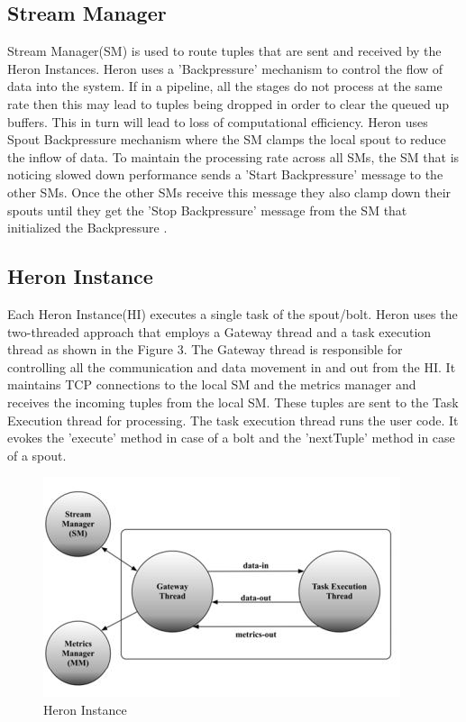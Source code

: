\documentclass[9pt,twocolumn,twoside]{styles/osajnl}
\begin{document}
\subsection{Stream Manager}
Stream Manager(SM) is used to route tuples that are sent and received by the Heron Instances. Heron uses a 'Backpressure' mechanism to control the flow of data into the system. If in a pipeline, all the stages do not process at the same rate then this may lead to tuples being dropped in order to clear the queued up buffers. This in turn will lead to loss of computational efficiency. Heron uses Spout Backpressure mechanism where the SM clamps the local spout to reduce the inflow of data. To maintain the processing rate across all SMs, the SM that is noticing slowed down performance sends a 'Start Backpressure' message to the other SMs. Once the other SMs receive this message they also clamp down their spouts until they get the 'Stop Backpressure' message from the SM that initialized the Backpressure \cite{TwitterHeron3}.
\subsection{Heron Instance}
Each Heron Instance(HI) executes a single task of the spout/bolt. Heron uses the two-threaded approach that employs a Gateway thread and a task execution thread as shown in the Figure 3. The Gateway thread is responsible for controlling all the communication and data movement in and out from the HI. It maintains TCP connections to the local SM and the metrics manager and receives the incoming tuples from the local SM. These tuples are sent to the Task Execution thread for processing. The task execution thread runs the user code. It evokes the 'execute' method in case of a bolt and the 'nextTuple' method in case of a spout.
\begin{figure}[htbp]
\begin{center}
\centering
\includegraphics[width=\linewidth]{images/img3}
\caption{Heron Instance \cite{TwitterHeron4}}
\label{fig:false-color}
\end{center}
\end{figure}
\end{document}
